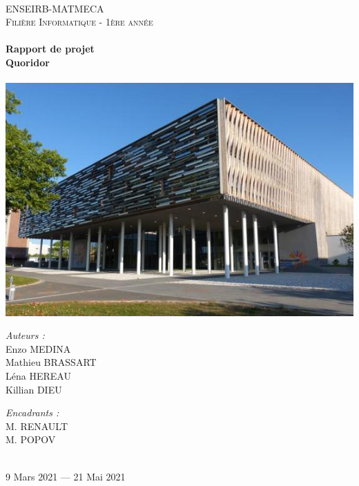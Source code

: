 \documentclass[a4paper]{article}
\begin{document}
\begin{titlepage}
    \begin{sffamily}
    \begin{center}
    
    ~\\[1.5cm]
    \textsc{\LARGE ENSEIRB-MATMECA}\\[1.5cm]
    
    \textsc{\Large Filière Informatique - 1ère année}\\[2cm]
    
    
        \hrulefill \\[0.4cm]
    { \Huge \bfseries Rapport de projet \\[0.4cm] }
    { \huge \bfseries Quoridor \\[0.4cm] }
     \hrulefill \\[2cm]
     
     \includegraphics[scale=0.6]{enseirb_matmeca.jpg} \\[1cm]
     
    \begin{minipage}{0.4\textwidth}
      \begin{flushleft} \large
         \emph{Auteurs :} \\
        Enzo MEDINA\\
        Mathieu BRASSART \\
        Léna HEREAU \\
        Killian DIEU \\
      \end{flushleft}
    \end{minipage}
    \begin{minipage}{0.4\textwidth}
      \begin{flushright} \large
        \emph{Encadrants :} \\
        M. RENAULT\\
        M. POPOV \\
      \end{flushright}
    \end{minipage}
    
     ~\\[1.5cm]
    {\large 9 Mars 2021 — 21 Mai 2021}
    
    \end{center}
    \end{sffamily}
\end{titlepage}
\end{document}
